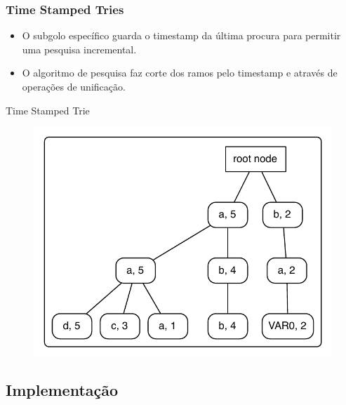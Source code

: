 \documentclass{beamer}
\begin{document}
\begin{frame}
  \frametitle{Time Stamped Tries}
  \begin{itemize}
     \item O subgolo específico guarda o timestamp da última procura para permitir uma pesquisa incremental.
     \item O algoritmo de pesquisa faz corte dos ramos pelo timestamp e através de operações de unificação.
  \end{itemize}
  \begin{block}{Time Stamped Trie}
      \begin{figure}[ht]
        \centering
          \includegraphics[scale=0.4]{tst_1.pdf}
      \end{figure}
    \end{block}
\end{frame}

\subsection{Implementação}
\end{document}
